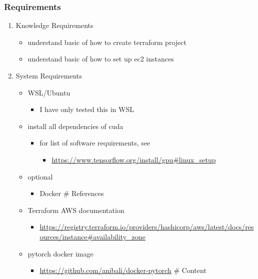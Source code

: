 \documentclass[11pt]{article}
\begin{document}
\subsubsection{Requirements}
\label{requirements}
\begin{enumerate}
\item Knowledge Requirements
\label{knowledge-requirements}
\begin{itemize}
\item understand basic of how to create terraform project
\item understand basic of how to set up ec2 instances
\end{itemize}

\item System Requirements
\label{system-requirements}
\begin{itemize}
\item WSL/Ubuntu

\begin{itemize}
\item I have only tested this in WSL
\end{itemize}

\item install all dependencies of cuda

\begin{itemize}
\item for list of software requirements, see

\begin{itemize}
\item \url{https://www.tensorflow.org/install/gpu\#linux\_setup}
\end{itemize}
\end{itemize}

\item optional

\begin{itemize}
\item Docker \# References
\end{itemize}

\item Terraform AWS documentation

\begin{itemize}
\item \url{https://registry.terraform.io/providers/hashicorp/aws/latest/docs/resources/instance\#availability\_zone}
\end{itemize}

\item pytorch docker image

\begin{itemize}
\item \url{https://github.com/anibali/docker-pytorch} \# Content
\end{itemize}
\end{itemize}
\end{enumerate}
\end{document}

